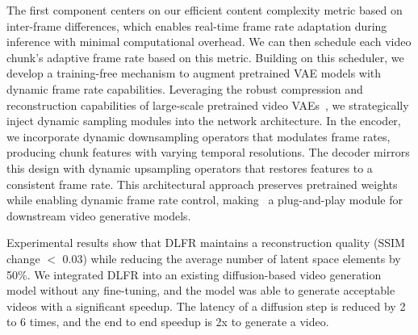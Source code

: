 The first component \raisebox{-1.1pt}{\ding[1.1]{182\relax}} centers on our efficient content complexity metric based on inter-frame differences, which enables real-time frame rate adaptation during inference with minimal computational overhead.
We can then schedule each video chunk's adaptive frame rate based on this metric. 
Building on this scheduler, we develop \raisebox{-1.1pt}{\ding[1.1]{183\relax}} a training-free mechanism to augment pretrained VAE models with dynamic frame rate capabilities. Leveraging the robust compression and reconstruction capabilities of large-scale pretrained video VAEs~\cite{wu2024improved,xing2024large,chen2024deep}, we strategically inject dynamic sampling modules into the network architecture. 
In the encoder, we incorporate dynamic downsampling operators that modulates frame rates, producing chunk features with varying temporal resolutions. 
The decoder mirrors this design with dynamic upsampling operators that restores features to a consistent frame rate.
This architectural approach preserves pretrained weights while enabling dynamic frame rate control, making \dlfr~a plug-and-play module for downstream video generative models.

Experimental results show that DLFR maintains a reconstruction quality (SSIM change $<$ 0.03) while reducing the average number of latent space elements by 50\%. We integrated DLFR into an existing diffusion-based video generation model without any fine-tuning, and the model was able to generate acceptable videos with a significant speedup. The latency of a diffusion step is reduced by 2 to 6 times, and the end to end speedup is 2x to generate a video.



